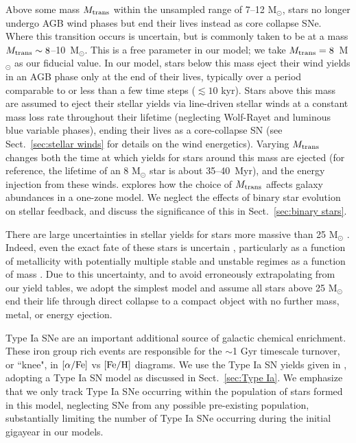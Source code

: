 \documentclass[fleqn,usenatbib,useAMS]{mnras}
\begin{document}
%
%

Above some mass $M_{\rm trans}$ within the unsampled range of 7--12 M$_{\odot}$, stars no longer undergo AGB wind phases but end their lives instead as core collapse SNe. Where this transition occurs is uncertain, but is commonly taken to be at a mass $M_{\rm trans} \sim 8$--10~M$_{\odot}$. This is a free parameter in our model; we take $M_{\rm trans} = 8$~M$_{\odot}$ as our fiducial value. In our model, stars below this mass eject their wind yields in an AGB phase only at the end of their lives, typically over a period comparable to or less than a few time steps ($\lesssim 10$ kyr). Stars above this mass are assumed to eject their stellar yields via line-driven stellar winds at a constant mass loss rate throughout their lifetime (neglecting Wolf-Rayet and luminous blue variable phases), ending their lives as a core-collapse SN (see Sect.~\ref{sec:stellar winds} for details on the wind energetics). Varying $M_{\rm trans}$ changes both the time at which yields for stars around this mass are ejected (for reference, the lifetime of an 8 M$_{\odot}$ star is about 35--40~Myr), and the energy injection from these winds. \citet{Cote2017a} explores how the choice of $M_{\rm trans}$ affects galaxy abundances in a one-zone model. We neglect the effects of binary star evolution on stellar feedback, and discuss the significance of this in Sect.~\ref{sec:binary stars}.

There are large uncertainties in stellar yields for stars more massive than 25 M$_{\odot}$ \citep[see ][and references therein]{Cote2016}. Indeed, even the exact fate of these stars is uncertain \citep[e.g.][]{Woosley2002,Zhang2008,Ugliano2012}, particularly as a function of metallicity \citep{Fryer2012} with potentially multiple stable and unstable regimes as a function of mass \citep{Heger2003}. Due to this uncertainty, and to avoid erroneously extrapolating from our yield tables, we adopt the simplest model and assume all stars above 25 M$_{\odot}$ end their life through direct collapse to a compact object with no further mass, metal, or energy ejection.

Type Ia SNe are an important additional source of galactic chemical enrichment. These iron group rich events are responsible for the $\sim$1 Gyr timescale turnover, or ``knee", in $[\alpha/\rm{Fe}]$ vs $[\rm{Fe}/\rm{H}]$ diagrams. We use the Type Ia SN yields given in \citet{Thielemann1986}, adopting a Type Ia SN model as discussed in Sect.~\ref{sec:Type Ia}. We emphasize that we only track Type Ia SNe occurring within the population of stars formed in this model, neglecting SNe from any possible pre-existing population, substantially limiting the number of Type Ia SNe occurring during the initial gigayear in our models.
\end{document}
